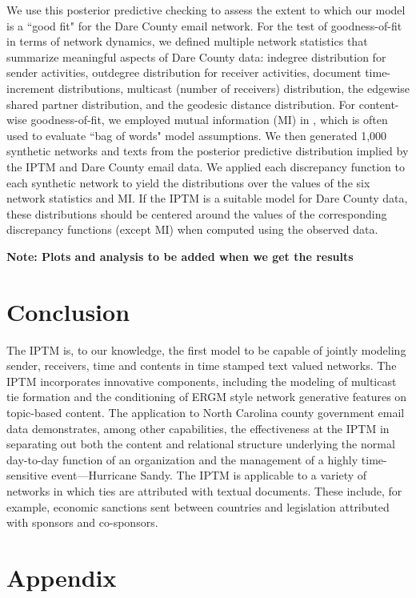 \documentclass[a4paper]{article}
\begin{document}
 We use this posterior predictive checking to assess the extent to which our model is a ``good fit" for the Dare County email network. For the test of goodness-of-fit in terms of network dynamics, we defined multiple network statistics that summarize meaningful aspects of Dare County data: indegree distribution for sender activities, outdegree distribution for receiver activities, document time-increment distributions, multicast (number of receivers) distribution, the edgewise shared partner distribution, and the geodesic distance distribution. For content-wise goodness-of-fit, we employed mutual information (MI) in \cite{mimno2011bayesian}, which is often used to evaluate ``bag of words" model assumptions. We then generated 1,000 synthetic networks and texts from the posterior predictive distribution implied by the IPTM and Dare County email data.
We applied each discrepancy function to each synthetic network to yield the distributions over the values of the six network statistics and MI. If the IPTM is a suitable model for Dare County data, these distributions should be centered around the values of the corresponding discrepancy functions (except MI) when computed using the observed data.

\textbf{Note: Plots and analysis to be added when we get the results}

\section{Conclusion} 
The IPTM is, to our knowledge, the first model to be capable of jointly modeling sender, receivers, time and contents in time stamped text valued networks. The IPTM incorporates innovative components, including the modeling of multicast tie formation and the conditioning of ERGM style network generative features on topic-based content. The application to North Carolina county government email data demonstrates, among other capabilities, the effectiveness at the IPTM in separating out both the content and relational structure underlying the normal day-to-day function of an organization and the management of a highly time-sensitive event---Hurricane Sandy. The IPTM is applicable to a variety of networks in which ties are attributed with textual documents. These include, for example, economic sanctions sent between countries and legislation attributed with sponsors and co-sponsors. 
 \clearpage


\newpage
\appendix
 \section*{Appendix}
 \renewcommand{\thesubsection}{\Alph{subsection}}
\end{document}

